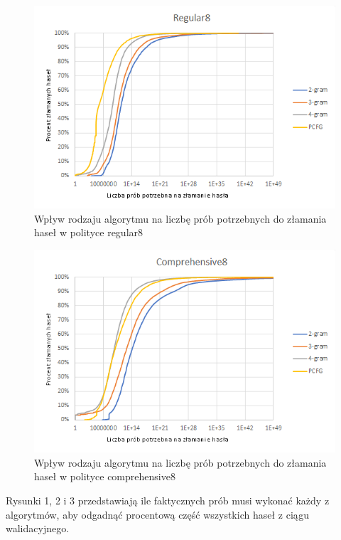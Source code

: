 \documentclass{article}
\begin{document}
	\begin{figure}[H]
		\centering
		\includegraphics{regular8}
		\caption{Wpływ rodzaju algorytmu na liczbę prób potrzebnych do złamania haseł w polityce regular8}
	\end{figure}

	\begin{figure}[H]
		\centering
		\includegraphics{comprehensive8}
		\caption{Wpływ rodzaju algorytmu na liczbę prób potrzebnych do złamania haseł w polityce comprehensive8}
	\end{figure}


	Rysunki 1, 2 i 3 przedstawiają ile faktycznych prób musi wykonać każdy z algorytmów, aby odgadnąć procentową część wszystkich haseł z ciągu walidacyjnego.
\end{document}
